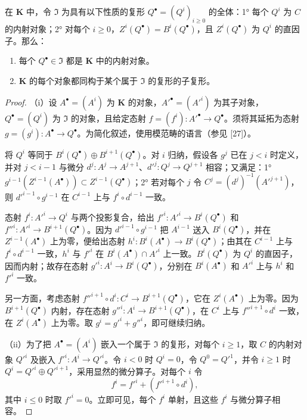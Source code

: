 在 $\mathbf K$ 中，令 $\mathfrak I$ 为具有以下性质的复形 $Q^\bullet=(Q^i)_{i\geq0}$ 的全体：1° 每个 $Q^i$ 为 $C$ 的内射对象；2° 对每个 $i\geq0$，$Z^i(Q^\bullet)=B^i(Q^\bullet)$，且 $Z^i(Q^\bullet)$ 为 $Q^i$ 的直因子。那么：
\begin{enumerate}[label=(\roman*)]
\item 每个 $Q^\bullet\in\mathfrak I$ 都是 $\mathbf K$ 中的内射对象。
\item $\mathbf K$ 的每个对象都同构于某个属于 $\mathfrak I$ 的复形的子复形。
\end{enumerate}
\begin{proof}
（i）设 $A^\bullet=(A^i)$ 为 $\mathbf K$ 的对象，$A'^\bullet=(A'^i)$ 为其子对象，$Q^\bullet=(Q^i)$ 为 $\mathfrak I$ 的对象，且给定态射 $f=(f^i):A'^\bullet\to Q^\bullet$。须将其延拓为态射 $g=(g^i):A^\bullet\to Q^\bullet$。为简化叙述，使用模范畴的语言（参见 [27]）。

将 $Q^i$ 等同于 $B^i(Q^\bullet)\oplus B^{i+1}(Q^\bullet)$。对 $i$ 归纳，假设各 $g^j$ 已在 $j<i$ 时定义，并对 $j<i-1$ 与微分 $d^j:A^j\to A^{j+1}$、$d'^j:Q^j\to Q^{j+1}$ 相容；又满足：1° $g^{i-1}(Z^{i-1}(A^\bullet))\subset Z^{i-1}(Q^\bullet)$；2° 若对每个 $j$ 令 $C^j=(d^j)^{-1}(A'^{j+1})$，则 $d'^{i-1}\circ g^{i-1}$ 在 $C^{i-1}$ 上与 $f^i\circ d^{i-1}$ 一致。

态射 $f^i:A'^i\to Q^i$ 与两个投影复合，给出 $f'^i:A'^i\to B^i(Q^\bullet)$ 和 $f''^i:A'^i\to B^{i+1}(Q^\bullet)$。因为 $d'^{i-1}\circ g^{i-1}$ 把 $A^{i-1}$ 送入 $B^i(Q^\bullet)$，并在 $Z^{i-1}(A^\bullet)$ 上为零，便给出态射 $h^i:B^i(A^\bullet)\to B^i(Q^\bullet)$；由其在 $C^{i-1}$ 上与 $f^i\circ d^{i-1}$ 一致，$h^i$ 与 $f'^i$ 在 $B^i(A^\bullet)\cap A'^i$ 上一致。$B^i(Q^\bullet)$ 为 $Q^i$ 的直因子，因而内射；故存在态射 $g'^i:A^i\to B^i(Q^\bullet)$，分别在 $B^i(A^\bullet)$ 和 $A'^i$ 上与 $h^i$ 和 $f'^i$ 一致。

另一方面，考虑态射 $f''^{i+1}\circ d^i:C^i\to B^{i+1}(Q^\bullet)$，它在 $Z^i(A^\bullet)$ 上为零。因为 $B^{i+1}(Q^\bullet)$ 内射，存在态射 $g''^i:A^i\to B^{i+1}(Q^\bullet)$，在 $C^i$ 上与 $f''^{i+1}\circ d^i$ 一致，在 $Z^i(A^\bullet)$ 上为零。取 $g^i=g'^i+g''^i$，即可继续归纳。

（ii）为了把 $A^\bullet=(A^i)$ 嵌入一个属于 $\mathfrak I$ 的复形，对每个 $i\geq1$，取 $C$ 的内射对象 $Q'^i$ 及嵌入 $f'^i:A^i\to Q'^i$。令 $i<0$ 时 $Q^i=0$，令 $Q^0=Q'^1$，并令 $i\geq1$ 时 $Q^i=Q'^i\oplus Q'^{i+1}$，采用显然的微分算子。对每个 $i$ 令
\[
f^i=f'^i+(f'^{i+1}\circ d^i),
\]
其中 $i\leq0$ 时取 $f'^i=0$。立即可见，每个 $f^i$ 单射，且这些 $f^i$ 与微分算子相容。
\end{proof}

